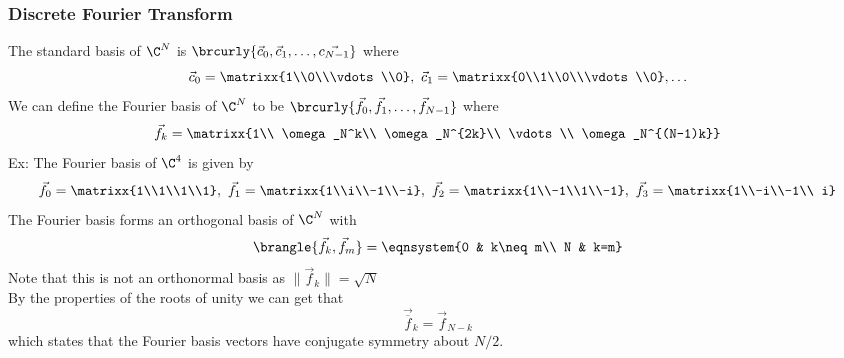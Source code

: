 \subsubsection{Discrete Fourier Transform}
The standard basis of $\C^N$ is $\brcurly{\vec{c}_0,\vec{c}_1,\ldots,\vec{c_{N-1}}}$
where
$$\vec{c}_0=\matrixx{1\\0\\\vdots\\0},\ \vec{c}_1=\matrixx{0\\1\\0\\\vdots\\0},\ldots$$
We can define the Fourier basis of $\C^N$ to be $\brcurly{\vec{f}_0,\vec{f}_1,\ldots,\vec{f}_{N-1}}$
where
$$\vec{f}_k=\matrixx{1\\ \omega_N^k\\ \omega_N^{2k}\\ \vdots\\ \omega_N^{(N-1)k}}$$
Ex: The Fourier basis of $\C^4$ is given by
$$\vec{f}_0=\matrixx{1\\1\\1\\1},\ \vec{f}_1=\matrixx{1\\i\\-1\\-i},\ \vec{f}_2=\matrixx{1\\-1\\1\\-1},\ \vec{f}_3=\matrixx{1\\-i\\-1\\ i}$$
The Fourier basis forms an orthogonal basis of $\C^N$ with
$$\brangle{\vec{f}_k,\vec{f}_m}=\eqnsystem{0 & k\neq m\\ N & k=m}$$
Note that this is not an orthonormal basis as $\|\vec{f}_k\|=\sqrt{N}$\\
By the properties of the roots of unity we can get that
$$\vec{\overline{f}}_k=\vec{f}_{N-k}$$
which states that the Fourier basis vectors have conjugate symmetry about $N/2$.\\

